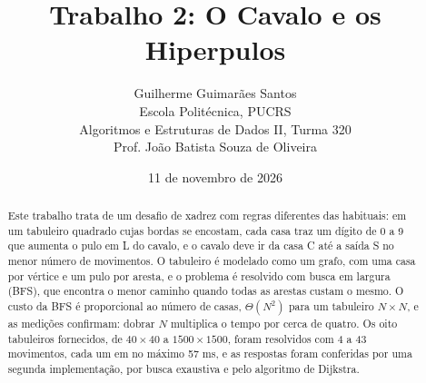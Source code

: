 \documentclass[11pt,a4paper]{article}
\title{Trabalho 2: O Cavalo e os Hiperpulos}
\author{Guilherme Guimarães Santos\\[2pt]
  \small Escola Politécnica, PUCRS\\
  \small Algoritmos e Estruturas de Dados II, Turma 320\\
  \small Prof. João Batista Souza de Oliveira}
\date{11 de novembro de 2026}
\begin{document}
\maketitle

\begin{abstract}
Este trabalho trata de um desafio de xadrez com regras diferentes das habituais: em um
tabuleiro quadrado cujas bordas se encostam, cada casa traz um dígito de 0 a 9 que aumenta
o pulo em L do cavalo, e o cavalo deve ir da casa C até a saída S no menor número de
movimentos. O tabuleiro é modelado como um grafo, com uma casa por vértice e um pulo por
aresta, e o problema é resolvido com busca em largura (BFS), que encontra o menor caminho
quando todas as arestas custam o mesmo. O custo da BFS é proporcional ao número de casas,
$\Theta(N^2)$ para um tabuleiro $N \times N$, e as medições confirmam: dobrar $N$ multiplica
o tempo por cerca de quatro. Os oito tabuleiros fornecidos, de $40 \times 40$ a
$1500 \times 1500$, foram resolvidos com 4 a 43 movimentos, cada um em no máximo 57 ms, e as
respostas foram conferidas por uma segunda implementação, por busca exaustiva e pelo
algoritmo de Dijkstra.
\end{abstract}







\end{document}
